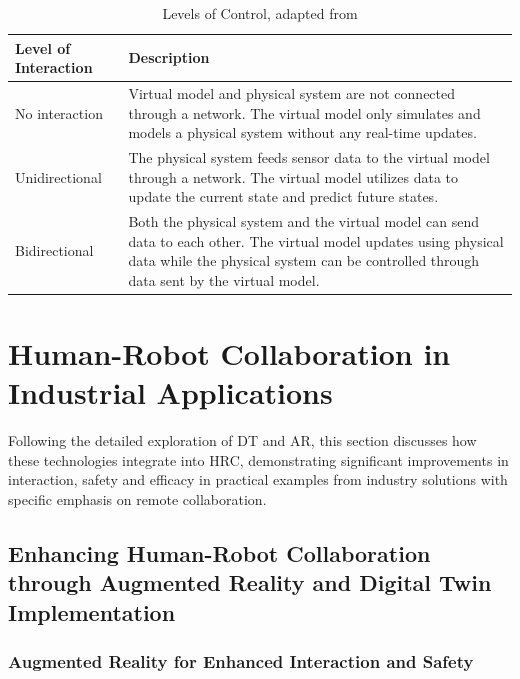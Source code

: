 \begin{table}[!htpb]
    \centering
    \caption{Levels of Control, adapted from \cite{liu2022state}}
    \label{tab:levels_of_control}
    \begin{tabular}{@{}l>{\raggedright\arraybackslash}p{10cm}@{}}
    \toprule
    Level of Interaction & Description \\ 
    \midrule
    No interaction & Virtual model and physical system are not connected through a network. The virtual model only simulates and models a physical 
    system without any real-time updates. \\ \hline
    Unidirectional & The physical system feeds sensor data to the virtual model through a network. The virtual model utilizes data to update the 
    current state and predict future states. \\ \hline
    Bidirectional & Both the physical system and the virtual model can send data to each other. The virtual model updates using physical data while 
    the physical system can be controlled through data sent by the virtual model. \\ 
    \bottomrule
    \end{tabular}
\end{table}


\section{Human-Robot Collaboration in Industrial Applications}
Following the detailed exploration of \ac{DT} and \ac{AR}, this section discusses how these technologies integrate into \ac{HRC}, demonstrating significant improvements in interaction, safety and efficacy in practical examples from industry solutions with specific emphasis on remote collaboration.

\subsection{Enhancing Human-Robot Collaboration through Augmented Reality and Digital Twin Implementation}

 

\subsubsection{Augmented Reality for Enhanced Interaction and Safety}

